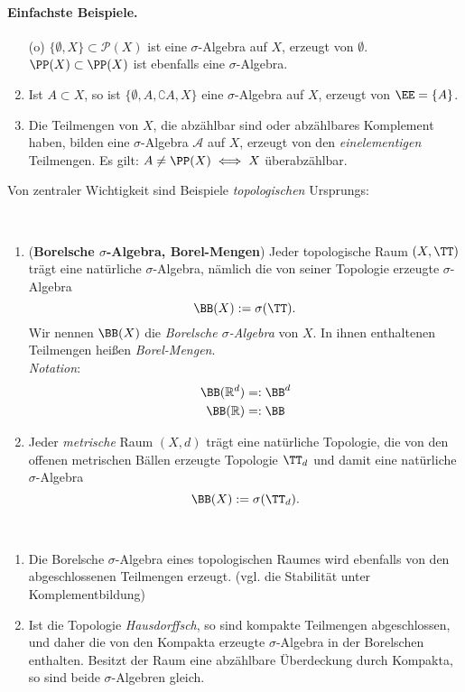 \paragraph{Einfachste Beispiele.} 
\begin{enumerate}[(\roman*),topsep=5pt, itemsep = 0 pt]
	\item[(o)]  $\{\emptyset, X\} \subset \mathcal{P}(X)$ ist eine $\sigma$-Algebra auf $X$, erzeugt von $\emptyset$.\\
	$\PP (X) \subset \PP (X)$ ist ebenfalls eine $\sigma$-Algebra.
	\item Ist $A \subset X$, so ist $\{\emptyset, A, \complement A, X\}$ eine $\sigma$-Algebra auf $X$, erzeugt von $\EE=\{A\}$.
	\item Die Teilmengen von $X$, die abzählbar sind oder abzählbares Komplement haben, bilden eine $\sigma$-Algebra $\mathcal{A}$ auf $X$, erzeugt von den \emph{einelementigen} Teilmengen. Es gilt: $A \neq \PP (X) \iff X $ überabzählbar. 
\end{enumerate}
Von zentraler Wichtigkeit sind Beispiele \emph{topologischen} Ursprungs:

\begin{example} \ 
\begin{enumerate}[(\roman*),topsep=5pt, itemsep = 0 pt]
	\item (\textbf{Borelsche $\sigma$-Algebra, Borel-Mengen}) Jeder topologische Raum $(X,\TT)$ trägt eine natürliche $\sigma$-Algebra, nämlich die von seiner Topologie erzeugte $\sigma$-Algebra
	$$\BB(X):=\sigma(\TT).$$
	Wir nennen $\BB(X)$ die \emph{Borelsche $\sigma$-Algebra} von $X$. In ihnen enthaltenen Teilmengen heißen \emph{Borel-Mengen}. \\
	\textit{Notation}: 
	\begin{equation*}
		\begin{split}
			\BB(\R^d) & =: \BB^d \\
			\BB(\R) & =: \BB
		\end{split}
	\end{equation*}
	\item Jeder \emph{metrische} Raum $(X,d)$ trägt eine natürliche Topologie, die von den offenen metrischen Bällen erzeugte Topologie $\TT_d$ und damit eine natürliche $\sigma$-Algebra
	$$\BB(X):=\sigma(\TT_d).$$
\end{enumerate}
\end{example}

\begin{remark} \
\begin{enumerate}[(\roman*),topsep=5pt, itemsep = 0 pt]
	\item Die Borelsche $\sigma$-Algebra eines topologischen Raumes wird ebenfalls von den abgeschlossenen Teilmengen erzeugt. (vgl. die Stabilität unter Komplementbildung)
	\item Ist die Topologie \emph{Hausdorffsch}, so sind kompakte Teilmengen abgeschlossen, und daher die von den Kompakta erzeugte $\sigma$-Algebra in der Borelschen enthalten. Besitzt der Raum eine abzählbare Überdeckung durch Kompakta, so sind beide $\sigma$-Algebren gleich.
\end{enumerate}
\end{remark}


